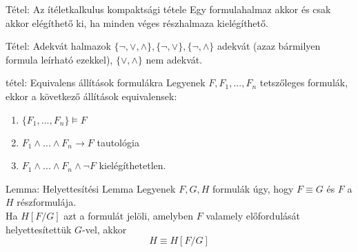 \documentclass{beamer}
\begin{document}
\begin{frame}

\begin{block}{Tétel: Az ítéletkalkulus kompaktsági tétele}
Egy formulahalmaz akkor és csak akkor elégíthető ki, ha minden véges részhalmaza kielégíthető.

\end{block}

\begin{block}{Tétel: Adekvát halmazok}
$\{\neg, \lor, \land\}, \{\neg, \lor\}, \{\neg, \land\}$ adekvát (azaz bármilyen formula leírható ezekkel), $\{\lor, \land\}$ nem adekvát.

\end{block}

\end{frame}


\begin{frame}

\begin{block}{tétel: Equivalens állítások formulákra}
Legyenek $F, F_1, ... , F_n$ tetszőleges formulák, ekkor a következő állítások equivalensek:

\begin{enumerate}
\item $\{F_1, ... , F_n\} \models F$
\item $F_1 \land ... \land F_n \rightarrow F$ tautológia
\item $F_1 \land ... \land F_n \land \neg F$ kielégíthetetlen.
\end{enumerate}

\end{block}

\end{frame}

\begin{frame}

\begin{block}{Lemma: Helyettesítési Lemma}
Legyenek $F, G, H$ formulák úgy, hogy $F \equiv G$ és $F$ a $H$ részformulája.\\
Ha $H[F/G]$ azt a formulát jelöli, amelyben $F$ valamely előfordulását helyettesítettük $G$-vel, akkor
$$H \equiv H[F/G]$$

\end{block}

\end{frame}
\end{document}
